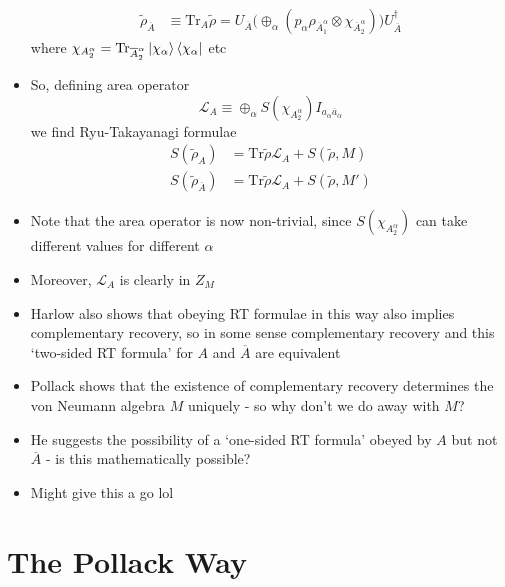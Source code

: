 \documentclass[12pt,a4paper]{article}
\numberwithin{equation}{section}
\newcommand{\ketbra}[2]{\ket{#1}\bra{#2}}
\newcommand{\ketbras}[1]{\ketbra{#1}{#1}}
\newcommand{\ol}[1]{\overline{#1}}
\theoremstyle{definition}
\theoremstyle{theorem}
\theoremstyle{example}
\begin{document}
\begin{itemize}
\begin{equation}
\begin{aligned}
				\tilde{\rho}_{\ol{A}}&\equiv\text{Tr}_{A}\tilde{\rho}=U_{\ol{A}}\bigg(\oplus_{\alpha}(p_{\alpha}\rho_{\ol{A}_{1}^{\alpha}}\otimes\chi_{\ol{A}_{2}^{\alpha}})\bigg)U_{\ol{A}}^{\dagger}
			\end{aligned}
		\end{equation}
		where $\chi_{A_{2}^{\alpha}}=\text{Tr}_{\ol{A}_{2}^{\alpha}}\ketbras{\chi_{\alpha}}$ etc
		\item So, defining area operator
		\begin{equation}
			\mathcal{L}_{A}\equiv\oplus_{\alpha}S(\chi_{A_{2}^{\alpha}})I_{a_{\alpha}\ol{a}_{\alpha}}
		\end{equation}
		we find Ryu-Takayanagi formulae
		\begin{equation}
			\begin{aligned}
				S(\tilde{\rho}_{A})&=\text{Tr}\tilde{\rho}\mathcal{L}_{A}+S(\tilde{\rho},M)\\
				S(\tilde{\rho}_{\ol{A}})&=\text{Tr}\tilde{\rho}\mathcal{L}_{A}+S(\tilde{\rho},M')
			\end{aligned}
		\end{equation}
		\item Note that the area operator is now non-trivial, since $S(\chi_{A_{2}^{\alpha}})$ can take different values for different $\alpha$
		\item Moreover, $\mathcal{L}_{A}$ is clearly in $Z_{M}$
		\item Harlow also shows that obeying RT formulae in this way also implies complementary recovery, so in some sense complementary recovery and this `two-sided RT formula' for $A$ and $\ol{A}$ are equivalent
		\item Pollack shows that the existence of complementary recovery determines the von Neumann algebra $M$ uniquely - so why don't we do away with $M$?
		\item He suggests the possibility of a `one-sided RT formula' obeyed by $A$ but not $\ol{A}$ - is this mathematically possible?
		\item Might give this a go lol
	\end{itemize}
	\section{The Pollack Way}
\end{document}
